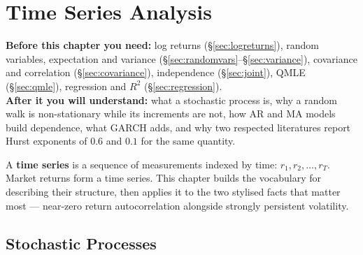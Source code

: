 \chapter{Time Series Analysis}
\label{ch:timeseries}

\begin{tcolorbox}[feynbox={Sky}{BBg},title={Before and After}]
\textbf{Before this chapter you need:} log returns (\S\ref{sec:logreturns}),
random variables, expectation and variance
(\S\ref{sec:randomvars}--\S\ref{sec:variance}), covariance and correlation
(\S\ref{sec:covariance}), independence (\S\ref{sec:joint}), QMLE
(\S\ref{sec:qmle}), regression and $R^2$ (\S\ref{sec:regression}).\\
\textbf{After it you will understand:} what a stochastic process is, why a
random walk is non-stationary while its increments are not, how AR and MA
models build dependence, what GARCH adds, and why two respected literatures
report Hurst exponents of $0.6$ and $0.1$ for the same quantity.
\end{tcolorbox}

A \textbf{time series} is a sequence of measurements indexed by time:
$r_1, r_2, \ldots, r_T$. Market returns form a time series. This chapter builds
the vocabulary for describing their structure, then applies it to the two
stylised facts that matter most --- near-zero return autocorrelation alongside
strongly persistent volatility.

\section{Stochastic Processes}
\label{sec:stochproc}



